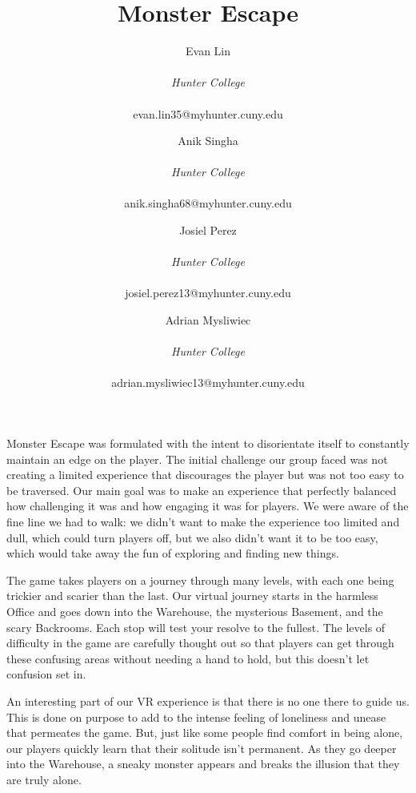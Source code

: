 \documentclass{vgtc}                          %
\title{Monster Escape}
\author{Evan Lin\\ %
    \parbox{1.4in}{\scriptsize  \centering\emph{Hunter College}}\\
    \scriptsize{evan.lin35@myhunter.cuny.edu}
\and Anik Singha\\ %
    \parbox{1.4in}{\scriptsize  \centering\emph{Hunter College}}\\
    \scriptsize{anik.singha68@myhunter.cuny.edu}
\and Josiel Perez\\ %
    \parbox{1.4in}{\scriptsize  \centering\emph{Hunter College}}\\
    \scriptsize{josiel.perez13@myhunter.cuny.edu}\\
\and Adrian Mysliwiec\\ %
    \parbox{1.4in}{\scriptsize  \centering\emph{Hunter College}}\\
    \scriptsize{adrian.mysliwiec13@myhunter.cuny.edu}
}
\begin{document}


\maketitle


Monster Escape was formulated with the intent to disorientate itself to constantly maintain an edge on the player. The initial challenge our group faced was not creating a limited experience that discourages the player but was not too easy to be traversed. Our main goal was to make an experience that perfectly balanced how challenging it was and how engaging it was for players. We were aware of the fine line we had to walk: we didn't want to make the experience too limited and dull, which could turn players off, but we also didn't want it to be too easy, which would take away the fun of exploring and finding new things.

The game takes players on a journey through many levels, with each one being trickier and scarier than the last. Our virtual journey starts in the harmless Office and goes down into the Warehouse, the mysterious Basement, and the scary Backrooms. Each stop will test your resolve to the fullest. The levels of difficulty in the game are carefully thought out so that players can get through these confusing areas without needing a hand to hold, but this doesn't let confusion set in.

An interesting part of our VR experience is that there is no one there to guide us. This is done on purpose to add to the intense feeling of loneliness and unease that permeates the game. But, just like some people find comfort in being alone, our players quickly learn that their solitude isn't permanent. As they go deeper into the Warehouse, a sneaky monster appears and breaks the illusion that they are truly alone.
\end{document}
